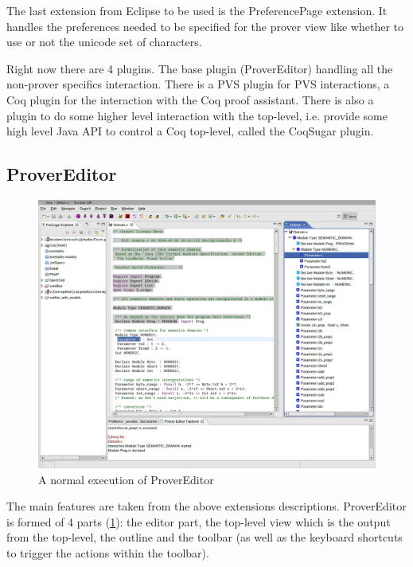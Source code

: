 \documentclass{entcs}
\begin{document}
The last extension from Eclipse to be used is the PreferencePage extension.
It handles the preferences needed to be specified for the prover view
like whether to use or not the unicode set of characters.


Right now there are 4 plugins. The base plugin (ProverEditor)
handling all the non-prover specifics interaction. There is a PVS plugin for
PVS interactions, a Coq plugin for the interaction with the Coq proof 
assistant. There is also a plugin to do some higher level interaction 
with the top-level, i.e. provide some high level Java API to control 
a Coq top-level, called the CoqSugar plugin. 

\subsection{ProverEditor}
\label{subsec:provereditor}
\begin{figure}
\begin{center}
\includegraphics[width=\linewidth]{screenshot1}
\end{center}
  \caption{A normal execution of ProverEditor}
  \label{scrs1}
\end{figure}
The main features are taken from the above extensions descriptions.
ProverEditor is formed of 4 parts 
(\ref{scrs1}): the editor part, the top-level view which is the output 
from the top-level, the outline and the toolbar (as well as the keyboard 
shortcuts to trigger the actions within the toolbar).
\end{document}

